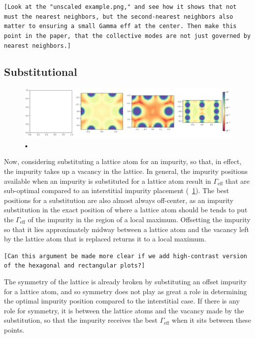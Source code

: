 \documentclass[aps,pra,superscriptaddress,twocolumn]{revtex4-1}
\newcommand{\fref}[1]{\text{Fig.}~\ref{#1}}
\newcommand{\commentSB}[1]{\texttt{\color{blue}[#1]}}
\newcommand{\commentTP}[1]{\texttt{\color{green}[#1]}}
\begin{document}
\commentTP{Look at the "unscaled example.png," and see how it shows that not must the nearest neighbors, but the second-nearest neighbors also matter to ensuring a small Gamma eff at the center. Then make this point in the paper, that the collective modes are not just governed by nearest neighbors.}

\subsection{Substitutional}

\begin{figure}
    \centering
    \includegraphics[width=1.0\textwidth]{figures/temp_substitution_figure.png} 
    \caption{•}
    \label{fig:substitution}
\end{figure}

Now, considering substituting a lattice atom for an impurity, so that, in effect, the impurity takes up a vacancy in the lattice.
In general, the impurity positions available when an impurity is substituted for a lattice atom result in $\Gamma_\text{eff}$ that are sub-optimal compared to an interstitial impurity placement (\fref{fig:substitution}). The best positions for a substitution are also almost always off-center, as an impurity substitution in the exact position of where a lattice atom should be tends to put the $\Gamma_\text{eff}$ of the impurity in the region of a local maximum. Offsetting the impurity so that it lies approximately midway between a lattice atom and the vacancy left by the lattice atom that is replaced returns it to a local maximum. 

\commentSB{Can this argument be made more clear if we add high-contrast version of the hexagonal and rectangular plots?}

The symmetry of the lattice is already broken by substituting an offset impurity for a lattice atom, and so symmetry does not play as great a role in determining the optimal impurity position compared to the interstitial case. If there is any role for symmetry, it is between the lattice atoms and the vacancy made by the substitution, so that the impurity receives the best $\Gamma_\text{eff}$ when it sits between these points. 
\end{document}
